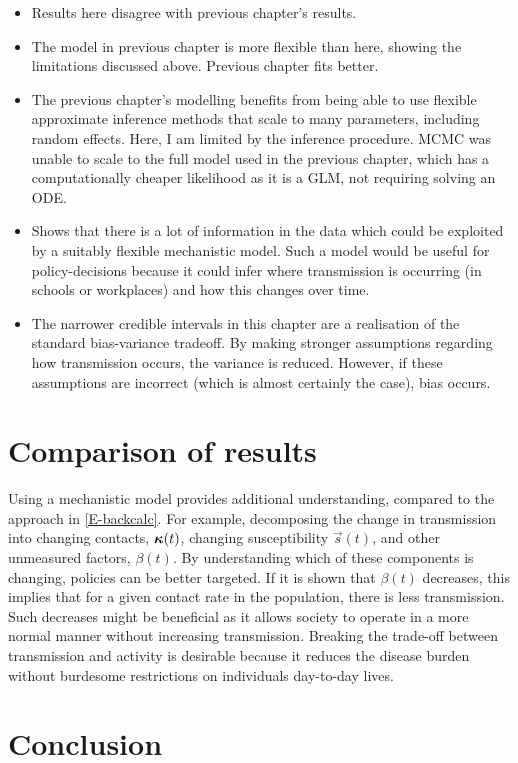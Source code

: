 \documentclass[thesis.tex]{subfiles}
\begin{document}

\begin{itemize}
    \item Results here disagree with previous chapter's results.
    \item The model in previous chapter is more flexible than here, showing the limitations discussed above. Previous chapter fits better.
    \item The previous chapter's modelling benefits from being able to use flexible approximate inference methods that scale to many parameters, including random effects. Here, I am limited by the inference procedure. MCMC was unable to scale to the full model used in the previous chapter, which has a computationally cheaper likelihood as it is a GLM, not requiring solving an ODE.
    \item Shows that there is a lot of information in the data which could be exploited by a suitably flexible mechanistic model. Such a model would be useful for policy-decisions because it could infer where transmission is occurring (\eg in schools or workplaces) and how this changes over time.
    \item The narrower credible intervals in this chapter are a realisation of the standard bias-variance tradeoff. By making stronger assumptions regarding how transmission occurs, the variance is reduced. However, if these assumptions are incorrect (which is almost certainly the case), bias occurs.
\end{itemize}


\section{Comparison of results}


Using a mechanistic model provides additional understanding, compared to the approach in \cref{E-backcalc}.
For example, decomposing the change in transmission into changing contacts, $\bm{\kappa}(t)$, changing susceptibility $\vec{s}(t)$, and other unmeasured factors, $\beta(t)$.
By understanding which of these components is changing, policies can be better targeted.
If it is shown that $\beta(t)$ decreases, this implies that for a given contact rate in the population, there is less transmission.
Such decreases might be beneficial as it allows society to operate in a more normal manner without increasing transmission.
Breaking the trade-off between transmission and activity is desirable because it reduces the disease burden without burdesome restrictions on individuals day-to-day lives.

\section{Conclusion}


\ifSubfilesClassLoaded{
  \listoftodos
}{}
\end{document}
